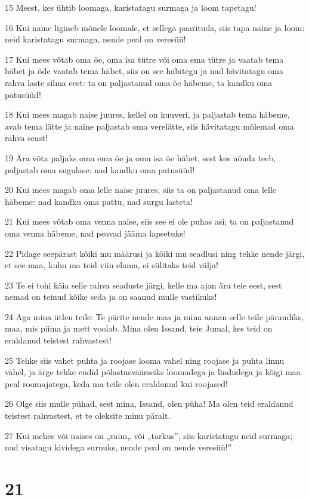 \par 15 Meest, kes ühtib loomaga, karistatagu surmaga ja loom tapetagu!
\par 16 Kui naine ligineb mõnele loomale, et sellega paarituda, siis tapa naine ja loom: neid karistatagu surmaga, nende peal on veresüü!
\par 17 Kui mees võtab oma õe, oma isa tütre või oma ema tütre ja vaatab tema häbet ja õde vaatab tema häbet, siis on see häbitegu ja nad hävitatagu oma rahva laste silma eest: ta on paljastanud oma õe häbeme, ta kandku oma patusüüd!
\par 18 Kui mees magab naise juures, kellel on kuuveri, ja paljastab tema häbeme, avab tema lätte ja naine paljastab oma verelätte, siis hävitatagu mõlemad oma rahva seast!
\par 19 Ära võta paljaks oma ema õe ja oma isa õe häbet, sest kes nõnda teeb, paljastab oma sugulase: nad kandku oma patusüüd!
\par 20 Kui mees magab oma lelle naise juures, siis ta on paljastanud oma lelle häbeme: nad kandku oma pattu, nad surgu lasteta!
\par 21 Kui mees võtab oma venna naise, siis see ei ole puhas asi; ta on paljastanud oma venna häbeme, nad peavad jääma lapsetuks!
\par 22 Pidage seepärast kõiki mu määrusi ja kõiki mu seadlusi ning tehke nende järgi, et see maa, kuhu ma teid viin elama, ei sülitaks teid välja!
\par 23 Te ei tohi käia selle rahva seaduste järgi, kelle ma ajan ära teie eest, sest nemad on teinud kõike seda ja on saanud mulle vastikuks!
\par 24 Aga mina ütlen teile: Te pärite nende maa ja mina annan selle teile pärandiks, maa, mis piima ja mett voolab. Mina olen Issand, teie Jumal, kes teid on eraldanud teistest rahvastest!
\par 25 Tehke siis vahet puhta ja roojase looma vahel ning roojase ja puhta linnu vahel, ja ärge tehke endid põlastusväärseiks loomadega ja lindudega ja kõigi maa peal roomajatega, keda ma teile olen eraldanud kui roojased!
\par 26 Olge siis mulle pühad, sest mina, Issand, olen püha! Ma olen teid eraldanud teistest rahvastest, et te oleksite minu päralt.
\par 27 Kui mehes või naises on „vaim„ või „tarkus”, siis karistatagu neid surmaga; nad visatagu kividega surnuks, nende peal on nende veresüü!”

\chapter{21}

